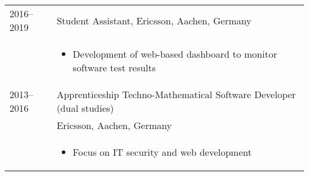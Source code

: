 
\begin{longtable}[l]{@{}p{} p{}}
    2016--2019 & Student Assistant, Ericsson, Aachen, Germany\\
    & \begin{itemize}
        \item \raggedright Development of web-based dashboard to monitor software test results
    \end{itemize}\\
    2013--2016 & Apprenticeship Techno-Mathematical Software Developer (dual studies)\\
               & Ericsson, Aachen, Germany\\
    & \begin{itemize}
        \item \raggedright Focus on IT security and web development
    \end{itemize}
\end{longtable}